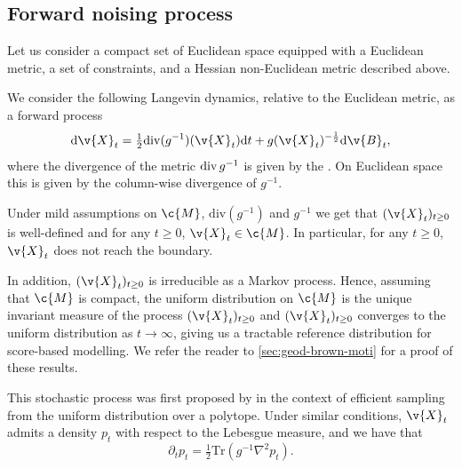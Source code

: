 \subsection{Forward noising process}
Let us consider a compact set of Euclidean space equipped with a Euclidean metric, a set of constraints, and a Hessian non-Euclidean metric described above.

We consider the following Langevin dynamics, relative to the Euclidean metric, as a forward process \begin{equation} \label{eq:langevin_hessian_manifold} { \mathrm{d} \v{X}_t = \tfrac{1}{2} \mathrm{div}({g}^{-1})( \v{X}_t) \mathrm{d} t + {g}( \v{X}_t)^{-\frac{1}{2}} \mathrm{d} \v{B}_t, } \end{equation} where the divergence of the metric \(\operatorname{div} g^{-1}\) is given by the .
On Euclidean space this is given by the column-wise divergence of \(g^{-1}\).

Under mild assumptions on \(\c{M}\), \(\mathrm{div}({g}^{-1})\) and \({g}^{-1}\) we get that \(( \v{X}_t)_{t \geq 0}\) is well-defined and for any \(t \geq 0\), \( \v{X}_t \in \c{M}\).
In particular, for any \(t \geq 0\), \( \v{X}_t\) does not reach the boundary.

In addition, \(( \v{X}_t)_{t \geq 0}\) is irreducible as a Markov process.
Hence, assuming that \(\c{M}\) is compact, the uniform distribution on \(\c{M}\) is the unique invariant measure of the process \(( \v{X}_t)_{t \geq 0}\) and \(( \v{X}_t)_{t \geq 0}\) converges to the uniform distribution as \(t\to\infty\), giving us a tractable reference distribution for score-based modelling.
We refer the reader to \cref{sec:geod-brown-moti} for a proof of these results.

This stochastic process was first proposed by \textcite{lee2017Geodesic} in the context of efficient sampling from the uniform distribution over a polytope.
Under similar conditions, \( \v{X}_t\) admits a density \(p_t\) with respect to the Lebesgue measure, and we have that \[\partial_t p_t = \tfrac{1}{2} \mathrm{Tr}({g}^{-1} \nabla^2p_t).\]

